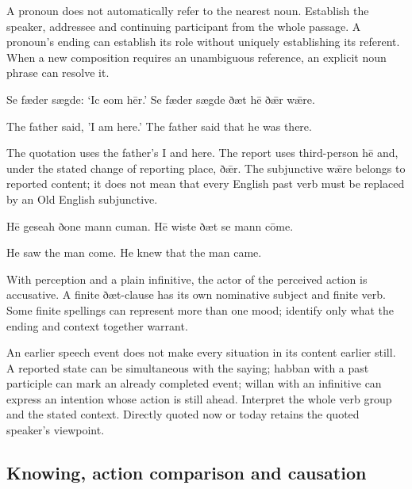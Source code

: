 A pronoun does not automatically refer to the nearest noun. Establish the speaker, addressee and continuing participant from the whole passage. A pronoun’s ending can establish its role without uniquely establishing its referent. When a new composition requires an unambiguous reference, an explicit noun phrase can resolve it.

Se fæder sægde: ‘Ic eom hēr.’ Se fæder sægde ðæt hē ðǣr wǣre.

The father said, 'I am here.' The father said that he was there.

The quotation uses the father’s I and here. The report uses third-person hē and, under the stated change of reporting place, ðǣr. The subjunctive wǣre belongs to reported content; it does not mean that every English past verb must be replaced by an Old English subjunctive.

Hē geseah ðone mann cuman. Hē wiste ðæt se mann cōme.

He saw the man come. He knew that the man came.

With perception and a plain infinitive, the actor of the perceived action is accusative. A finite ðæt-clause has its own nominative subject and finite verb. Some finite spellings can represent more than one mood; identify only what the ending and context together warrant.

An earlier speech event does not make every situation in its content earlier still. A reported state can be simultaneous with the saying; habban with a past participle can mark an already completed event; willan with an infinitive can express an intention whose action is still ahead. Interpret the whole verb group and the stated context. Directly quoted now or today retains the quoted speaker’s viewpoint.

\subsection*{Knowing, action comparison and causation}

